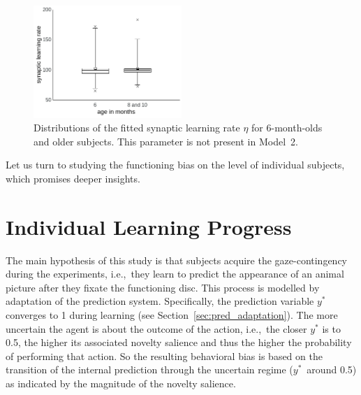 \documentclass[a4paper]{scrreprt}
\begin{document}
\begin{figure}
\centering        
\includegraphics[width=0.5\textwidth]{figs/sec3/age/age2_sigma_lr_mod1.jpeg}
\caption{Distributions of the fitted synaptic learning rate $\eta$  for 6-month-olds and older subjects. This parameter is not present in Model~2.}
\label{fig:age2_params2}
\end{figure}

Let us turn to studying the functioning bias on the level of individual subjects, which promises deeper insights.

\clearpage

\section{Individual Learning Progress}
\label{sec:ind_learning}

The main hypothesis of this study is that subjects acquire the gaze-contingency during the experiments, i.e.,~they learn to predict the appearance of an animal picture after they fixate the functioning disc. This process is modelled by adaptation of the prediction system. Specifically, the prediction variable $y^*$ converges to 1 during learning (see Section~\ref{sec:pred_adaptation}). The more uncertain the agent is about the outcome of the action, i.e.,~the closer $y^*$ is to 0.5, the higher its associated novelty salience and thus the higher the probability of performing that action. So the resulting behavioral bias is based on the transition of the internal prediction through the uncertain regime ($y^*$~around 0.5) as indicated by the magnitude of the novelty salience.
\end{document}

